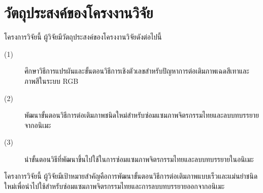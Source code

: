\clearpage
\section{วัตถุประสงค์ของโครงงานวิจัย}
\hspace{1cm} โครงการวิจัยนี้ ผู้วิจัยมีวัตถุประสงค์ของโครงงานวิจัยดังต่อไปนี้

\begin{description}
	\item[(1)] ศึกษาวิธีการแปรผันและขั้นตอนวิธีการเชิงตัวเลขสำหรับปัญหาการต่อเติมภาพเฉดสีเทาและภาพสีในระบบ RGB
	\item[(2)] พัฒนาขั้นตอนวิธีการต่อเติมภาพชนิดใหม่สำหรับซ่อมแซมภาพจิตรกรรมไทยและลบบทบรรยายจากอนิเมะ
	\item[(3)] นำขั้นตอนวิธีที่พัฒนาขึ้นไปใช้ในการซ่อมแซมภาพจิตรกรรมไทยและลบบทบรรยายในอนิเมะ
\end{description}

โครงการวิจัยนี้ ผู้วิจัยมีเป้าหมายสำคัญคือการพัฒนาขั้นตอนวิธีการต่อเติมภาพแบบเร็วและแม่นยำชนิดใหม่เพื่อนำไปใช้สำหรับซ่อมแซมภาพจิตรกรรมไทยและการลบบทบรรยายออกจากอนิเมะ